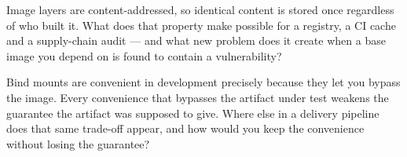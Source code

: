 \begin{thinkbox}
Image layers are content-addressed, so identical content is stored once regardless of who built it. What does that property make possible for a registry, a CI cache and a supply-chain audit --- and what new problem does it create when a base image you depend on is found to contain a vulnerability?
\end{thinkbox}

\begin{thinkbox}
Bind mounts are convenient in development precisely because they let you bypass the image. Every convenience that bypasses the artifact under test weakens the guarantee the artifact was supposed to give. Where else in a delivery pipeline does that same trade-off appear, and how would you keep the convenience without losing the guarantee?
\end{thinkbox}


